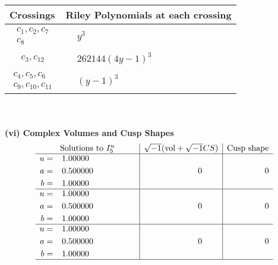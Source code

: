 \documentclass[1p]{elsarticle_modified}
\theoremstyle{definition}
\newcommand{\I}{\sqrt{-1}}
\begin{document}
\begin{tabular}{m{50pt}|m{274pt}}
Crossings & \hspace{64pt}Riley Polynomials at each crossing \\
\hline $$\begin{aligned}c_{1},c_{2},c_{7}\\c_{8}\end{aligned}$$&$\begin{aligned}
&y^3
\end{aligned}$\\
\hline $$\begin{aligned}c_{3},c_{12}\end{aligned}$$&$\begin{aligned}
&262144(4 y-1)^3
\end{aligned}$\\
\hline $$\begin{aligned}c_{4},c_{5},c_{6}\\c_{9},c_{10},c_{11}\end{aligned}$$&$\begin{aligned}
&(y-1)^3
\end{aligned}$\\
\hline
\end{tabular}\\~\\
\newpage\flushleft \textbf{(vi) Complex Volumes and Cusp Shapes}
$$\begin{array}{c|c|c}  
\text{Solutions to }I^u_{5}& \I (\text{vol} + \sqrt{-1}CS) & \text{Cusp shape}\\
 \hline 
\begin{aligned}
u &= \phantom{-}1.00000\phantom{ +0.000000I} \\
a &= \phantom{-}0.500000\phantom{ +0.000000I} \\
b &= \phantom{-}1.00000\phantom{ +0.000000I}\end{aligned}
 & \phantom{-0.000000 } 0 & \phantom{-0.000000 } 0 \\ \hline\begin{aligned}
u &= \phantom{-}1.00000\phantom{ +0.000000I} \\
a &= \phantom{-}0.500000\phantom{ +0.000000I} \\
b &= \phantom{-}1.00000\phantom{ +0.000000I}\end{aligned}
 & \phantom{-0.000000 } 0 & \phantom{-0.000000 } 0 \\ \hline\begin{aligned}
u &= \phantom{-}1.00000\phantom{ +0.000000I} \\
a &= \phantom{-}0.500000\phantom{ +0.000000I} \\
b &= \phantom{-}1.00000\phantom{ +0.000000I}\end{aligned}
 & \phantom{-0.000000 } 0 & \phantom{-0.000000 } 0\\
 \hline 
 \end{array}$$\newpage
\end{document}
